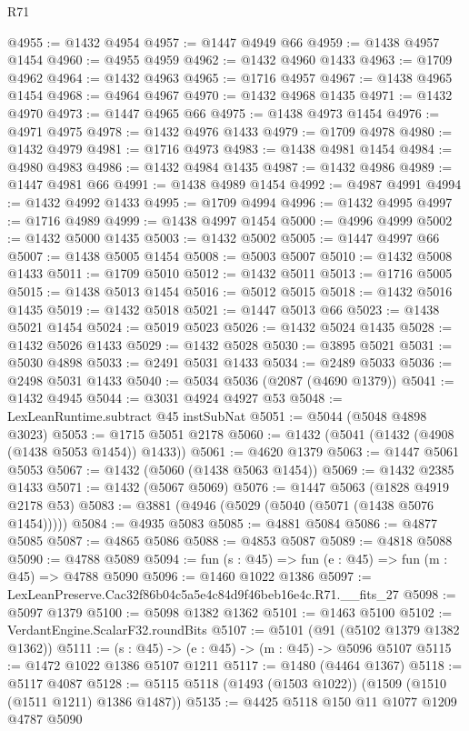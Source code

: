 \begin{lexlean}{R71}
\begin{coremodule}
@4955 := @1432 @4954
@4957 := @1447 @4949 @66
@4959 := @1438 @4957 @1454
@4960 := @4955 @4959
@4962 := @1432 @4960 @1433
@4963 := @1709 @4962
@4964 := @1432 @4963
@4965 := @1716 @4957
@4967 := @1438 @4965 @1454
@4968 := @4964 @4967
@4970 := @1432 @4968 @1435
@4971 := @1432 @4970
@4973 := @1447 @4965 @66
@4975 := @1438 @4973 @1454
@4976 := @4971 @4975
@4978 := @1432 @4976 @1433
@4979 := @1709 @4978
@4980 := @1432 @4979
@4981 := @1716 @4973
@4983 := @1438 @4981 @1454
@4984 := @4980 @4983
@4986 := @1432 @4984 @1435
@4987 := @1432 @4986
@4989 := @1447 @4981 @66
@4991 := @1438 @4989 @1454
@4992 := @4987 @4991
@4994 := @1432 @4992 @1433
@4995 := @1709 @4994
@4996 := @1432 @4995
@4997 := @1716 @4989
@4999 := @1438 @4997 @1454
@5000 := @4996 @4999
@5002 := @1432 @5000 @1435
@5003 := @1432 @5002
@5005 := @1447 @4997 @66
@5007 := @1438 @5005 @1454
@5008 := @5003 @5007
@5010 := @1432 @5008 @1433
@5011 := @1709 @5010
@5012 := @1432 @5011
@5013 := @1716 @5005
@5015 := @1438 @5013 @1454
@5016 := @5012 @5015
@5018 := @1432 @5016 @1435
@5019 := @1432 @5018
@5021 := @1447 @5013 @66
@5023 := @1438 @5021 @1454
@5024 := @5019 @5023
@5026 := @1432 @5024 @1435
@5028 := @1432 @5026 @1433
@5029 := @1432 @5028
@5030 := @3895 @5021
@5031 := @5030 @4898
@5033 := @2491 @5031 @1433
@5034 := @2489 @5033
@5036 := @2498 @5031 @1433
@5040 := @5034 @5036 (@2087 (@4690 @1379))
@5041 := @1432 @4945
@5044 := @3031 @4924 @4927 @53
@5048 := LexLeanRuntime.subtract @45 instSubNat
@5051 := @5044 (@5048 @4898 @3023)
@5053 := @1715 @5051 @2178
@5060 := @1432 (@5041 (@1432 (@4908 (@1438 @5053 @1454)) @1433))
@5061 := @4620 @1379
@5063 := @1447 @5061 @5053
@5067 := @1432 (@5060 (@1438 @5063 @1454))
@5069 := @1432 @2385 @1433
@5071 := @1432 (@5067 @5069)
@5076 := @1447 @5063 (@1828 @4919 @2178 @53)
@5083 := @3881 (@4946 (@5029 (@5040 (@5071 (@1438 @5076 @1454)))))
@5084 := @4935 @5083
@5085 := @4881 @5084
@5086 := @4877 @5085
@5087 := @4865 @5086
@5088 := @4853 @5087
@5089 := @4818 @5088
@5090 := @4788 @5089
@5094 := fun (s : @45) => fun (e : @45) => fun (m : @45) => @4788 @5090
@5096 := @1460 @1022 @1386
@5097 := LexLeanPreserve.Cac32f86b04c5a5e4c84d9f46beb16e4c.R71.__fits_27
@5098 := @5097 @1379
@5100 := @5098 @1382 @1362
@5101 := @1463 @5100
@5102 := VerdantEngine.ScalarF32.roundBits
@5107 := @5101 (@91 (@5102 @1379 @1382 @1362))
@5111 := (s : @45) -> (e : @45) -> (m : @45) -> @5096 @5107
@5115 := @1472 @1022 @1386 @5107 @1211
@5117 := @1480 (@4464 @1367)
@5118 := @5117 @4087
@5128 := @5115 @5118 (@1493 (@1503 @1022)) (@1509 (@1510 (@1511 @1211) @1386 @1487))
@5135 := @4425 @5118 @150 @11 @1077 @1209 @4787 @5090

\end{coremodule}
\end{lexlean}
